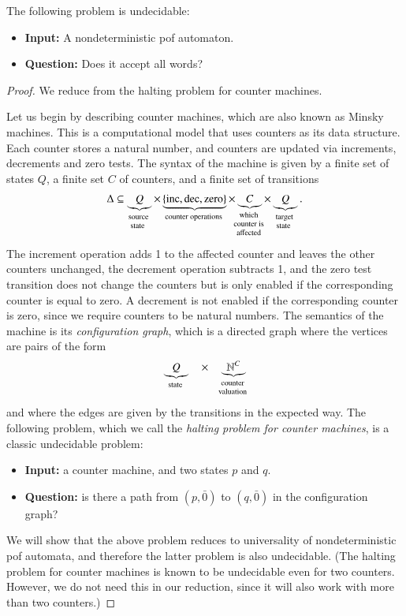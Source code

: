 \begin{theorem}\label{thm:universality-undecidable-pof}
    The following problem is undecidable: 
    \begin{itemize}
        \item \textbf{Input:} A nondeterministic pof automaton.
        \item \textbf{Question:} Does it accept all words?
    \end{itemize} 
\end{theorem}
\begin{proof}
    We  reduce from the halting problem for counter machines. 
    
    Let us begin by describing counter machines, which are also known as Minsky machines. This is a  computational model that uses  counters as its data structure. Each counter  stores a natural number, and counters are updated via increments, decrements and zero tests. The syntax of the machine is given by a finite set of states $Q$, a finite set $C$ of counters, and a finite set of transitions
\begin{align*}
\Delta \subseteq 
\myunderbrace{Q}{source \\ state } \times \myunderbrace{\set{\text{inc},\text{dec},\text{zero}}}{counter operations}  \times 
\myunderbrace{C}{which \\ counter is \\ affected} \times  
\myunderbrace{Q}{target \\ state }.
\end{align*}
The increment operation adds 1 to the affected counter and leaves the other counters unchanged, the decrement operation subtracts 1, and the zero test transition does not change the counters but is only enabled if the corresponding counter is equal to zero. A decrement is not enabled if the corresponding counter is zero, since we require counters to be natural numbers. The semantics of the machine is its \emph{configuration graph}, which is a directed graph where  the vertices are pairs of the form
\begin{align*}
\myunderbrace{Q}{state} \quad \times \quad \myunderbrace{\Nat^C}{counter\\ valuation}
\end{align*}
and where the edges are given by the transitions in the expected way. The following problem, which we call the \emph{halting problem for counter machines}, is a classic undecidable problem:
\begin{itemize}
    \item \textbf{Input:} a counter machine, and two states $p$ and $q$.
    \item \textbf{Question:} is there a path from $(p,\bar 0)$ to $(q,\bar 0)$ in the configuration graph?
\end{itemize}
We will show that the above problem reduces to universality of nondeterministic pof automata, and therefore the latter problem is also undecidable.  
(The halting problem for counter machines is known to be undecidable even for two counters. However, we do not need this in our reduction, since it will also work with more than two counters.)


\end{proof}
